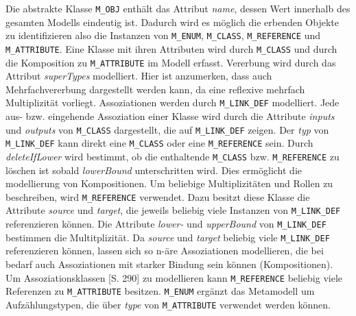 Die abstrakte Klasse \texttt{M\_OBJ} enth\"alt das Attribut \textit{name}, dessen Wert innerhalb des gesamten Modells eindeutig ist. Dadurch wird es m\"oglich die erbenden Objekte zu identifizieren also die Instanzen von \texttt{M\_ENUM}, \texttt{M\_CLASS}, \texttt{M\_REFERENCE} und \texttt{M\_ATTRIBUTE}.
Eine Klasse mit ihren Attributen wird durch \texttt{M\_CLASS} und durch die Komposition zu \texttt{M\_ATTRIBUTE} im Modell erfasst. Vererbung wird durch das Attribut \textit{superTypes} modelliert. Hier ist anzumerken, dass auch Mehrfachvererbung dargestellt werden kann, da eine reflexive mehrfach Multiplizität vorliegt. 
Assoziationen werden durch \texttt{M\_LINK\_DEF} modelliert. Jede aus- bzw. eingehende Assoziation einer Klasse wird durch die Attribute \textit{inputs} und \textit{outputs} von \texttt{M\_CLASS} dargestellt, die auf \texttt{M\_LINK\_DEF} zeigen. Der \textit{typ} von \texttt{M\_LINK\_DEF} kann direkt eine \texttt{M\_CLASS} oder eine \texttt{M\_REFERENCE} sein. Durch \textit{deleteIfLower} wird bestimmt, ob die enthaltende \texttt{M\_CLASS} bzw. \texttt{M\_REFERENCE} zu löschen ist sobald \textit{lowerBound} unterschritten wird. Dies erm\"oglicht die modellierung von Kompositionen. Um beliebige Multiplizitäten und Rollen zu beschreiben, wird \texttt{M\_REFERENCE} verwendet. Dazu besitzt diese Klasse die Attribute \textit{source} und \textit{target}, die jeweils beliebig viele Instanzen von \texttt{M\_LINK\_DEF} referenzieren können. Die Attribute \textit{lower-} und \textit{upperBound} von \texttt{M\_LINK\_DEF} bestimmen die Multitplizität. Da \textit{source} und \textit{target} beliebig viele \texttt{M\_LINK\_DEF} referenzieren k\"onnen, lassen sich so n-\"are Assoziationen modellieren, die bei bedarf auch Assoziationen mit starker Bindung sein k\"onnen (Kompositionen).\\
Um Assoziationsklassen \cite{larman2005book}[S. 290] zu modellieren kann \texttt{M\_\-REF\-ER\-ENCE} beliebig viele Referenzen zu \texttt{M\_AT\-TRI\-BUTE} besitzen. \texttt{M\_ENUM} erg\"anzt das Metamodell um Aufz\"ahlungstypen, die \"uber \textit{type} von \texttt{M\_ATTRIBUTE} verwendet werden k\"onnen.\\
